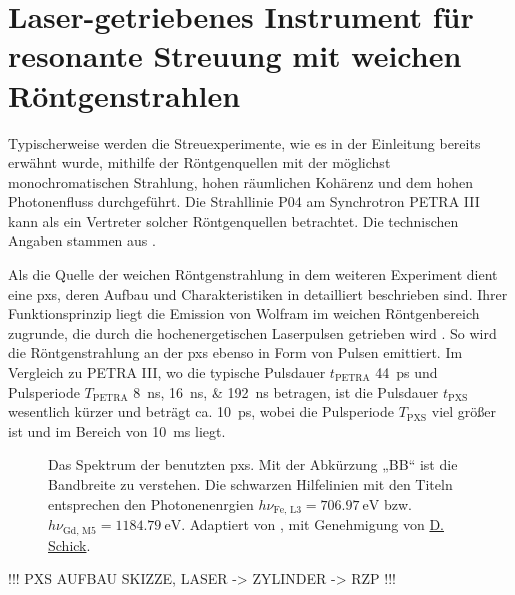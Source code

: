 \chapter{Laser-getriebenes Instrument für resonante Streuung mit weichen Röntgenstrahlen}
\label{text:quelle_roentgen}
Typischerweise werden die Streuexperimente, wie es in der Einleitung bereits erwähnt wurde, mithilfe der Röntgenquellen mit der möglichst monochromatischen Strahlung, hohen räumlichen Kohärenz und dem hohen Photonenfluss durchgeführt. Die Strahllinie P04 am Synchrotron PETRA III kann als ein Vertreter solcher Röntgenquellen betrachtet. Die technischen Angaben stammen aus \cite{viefhaus_variable_2013}.

\noindent
Als die Quelle der weichen Röntgenstrahlung in dem weiteren Experiment dient eine \gls{pxs}, deren Aufbau und Charakteristiken in \cite{schick_laser-driven_2021} detailliert beschrieben sind. Ihrer Funktionsprinzip liegt die Emission von Wolfram im weichen Röntgenbereich zugrunde, die durch die hochenergetischen Laserpulsen getrieben wird \cite{mantouvalou_high_2015}. So wird die Röntgenstrahlung an der \gls{pxs} ebenso in Form von Pulsen emittiert. Im Vergleich zu PETRA III, wo die typische Pulsdauer $t_\text{PETRA}$ \SI{44}{\pico\second} und Pulsperiode $T_\text{PETRA}$ \qtylist{8;16;192}{\nano\second}  betragen, ist die Pulsdauer $t_\text{PXS}$ wesentlich kürzer und beträgt ca. \SI{10}{\pico\second}, wobei die Pulsperiode $T_\text{PXS}$ viel größer ist und im Bereich von \SI{10}{\milli\second} liegt.
\begin{figure}[H]
    \centering
    
    \caption{Das Spektrum der benutzten \gls{pxs}. Mit der Abkürzung „BB“ ist die Bandbreite zu verstehen. Die schwarzen Hilfelinien mit den Titeln entsprechen den Photonenenrgien $h\nu_{\text{Fe, L3}} = \SI{706.97}{\eV}$ bzw. $h\nu_{\text{Gd, M5}} = \SI{1184,79}{\eV}$. Adaptiert von \cite{schick_laser-driven_2021}, mit Genehmigung von \href{https://orcid.org/0000-0001-7988-6489}{D. Schick}.}
    \label{fig:pxs_spectrum}
\end{figure}
\noindent
!!! PXS AUFBAU SKIZZE, LASER -> ZYLINDER -> RZP !!!

